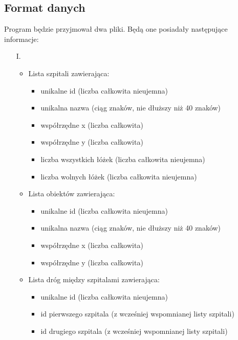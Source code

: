 \documentclass{article}
\begin{document}
    \subsection{Format danych}
        Program będzie przyjmował dwa pliki. Będą one posiadały następujące informacje:
        \begin{itemize}
            \item[I.]
            \begin{itemize}
                \item Lista szpitali zawierająca:
                    \begin{itemize}
                        \item unikalne id (liczba całkowita nieujemna)
                        \item unikalna nazwa (ciąg znaków, nie dłuższy niż 40 znaków)
                        \item współrzędne x (liczba całkowita)
                        \item współrzędne y (liczba całkowita)
                        \item liczba wszystkich łóżek (liczba całkowita nieujemna)
                        \item liczba wolnych łóżek (liczba całkowita nieujemna)
                    \end{itemize}
                \item Lista obiektów zawierająca:
                    \begin{itemize}
                        \item unikalne id (liczba całkowita nieujemna)
                        \item unikalna nazwa (ciąg znaków, nie dłuższy niż 40 znaków)
                        \item współrzędne x (liczba całkowita)
                        \item współrzędne y (liczba całkowita)
                    \end{itemize}
                \item Lista dróg między szpitalami zawierająca:
                    \begin{itemize}
                        \item unikalne id (liczba całkowita nieujemna)
                        \item id pierwszego szpitala (z wcześniej wspomnianej listy szpitali)
                        \item id drugiego szpitala (z wcześniej wspomnianej listy szpitali)

\end{itemize}
\end{itemize}
\end{itemize}
\end{document}
